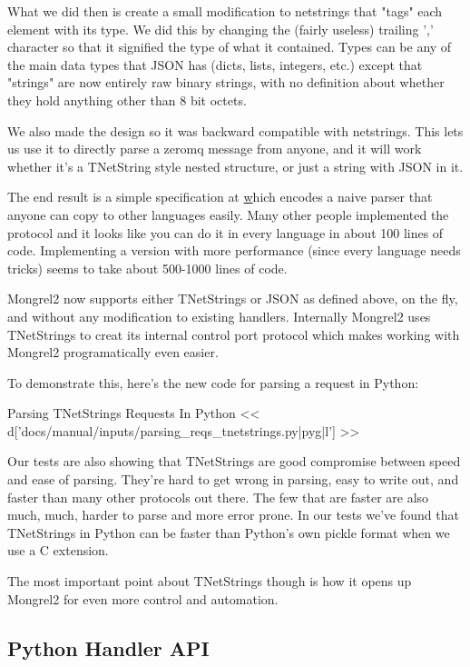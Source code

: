 What we did then is create a small modification to netstrings that "tags"
each element with its type.  We did this by changing the (fairly useless)
trailing ',' character so that it signified the type of what it contained.
Types can be any of the main data types that JSON has (dicts, lists, integers, etc.)
except that "strings" are now entirely raw binary strings, with no
definition about whether they hold anything other than 8 bit octets.

We also made the design so it was backward compatible with netstrings.
This lets us use it to directly parse a zeromq message from anyone, and
it will work whether it's a TNetString style nested structure, or just
a string with JSON in it.

The end result is a simple specification at \href{http://tnetstrings.org}
which encodes a naive parser that anyone can copy to other languages easily.
Many other people implemented the protocol and it looks like you can do
it in every language in about 100 lines of code.  Implementing a version
with more performance (since every language needs tricks) seems to take
about 500-1000 lines of code.

Mongrel2 now supports either TNetStrings or JSON as defined above, on the
fly, and without any modification to existing handlers.  Internally  Mongrel2
uses TNetStrings to creat its internal control port protocol which makes
working with Mongrel2 programatically even easier.

To demonstrate this, here's the new code for parsing a request in Python:


\begin{code}{Parsing TNetStrings Requests In Python}
<< d['docs/manual/inputs/parsing_reqs_tnetstrings.py|pyg|l'] >>
\end{code}

Our tests are also showing that TNetStrings are good compromise between
speed and ease of parsing.  They're hard to get wrong in parsing, easy
to write out, and faster than many other protocols out there.  The few
that are faster are also much, much, harder to parse and more error
prone.  In our tests we've found that TNetStrings in Python can be
faster than Python's own pickle format when we use a C extension.

The most important point about TNetStrings though is how it opens up
Mongrel2 for even more control and automation.

\subsection{Python Handler API}

